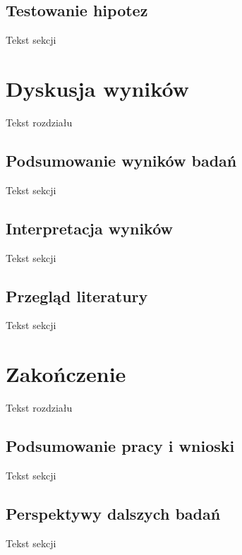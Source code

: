 \documentclass[licencjacka]{pracamgr_Kogni}
\begin{document}
\section{Testowanie hipotez}
Tekst sekcji

\chapter{Dyskusja wyników}
Tekst rozdziału
\section{Podsumowanie wyników badań}
Tekst sekcji
\section{Interpretacja wyników}
Tekst sekcji
\section{Przegląd literatury}
Tekst sekcji

\chapter{Zakończenie}
Tekst rozdziału
\section{Podsumowanie pracy i wnioski}
Tekst sekcji
\section{Perspektywy dalszych badań}
Tekst sekcji
\end{document}
